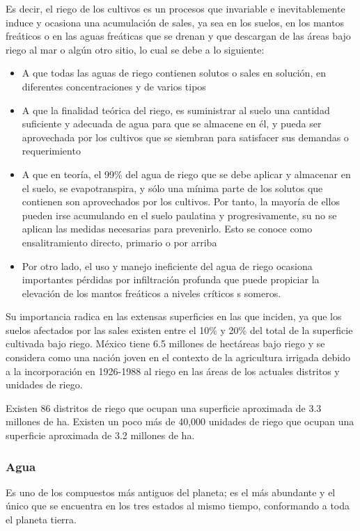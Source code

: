     Es decir, el riego de los cultivos es un procesos que invariable e inevitablemente induce y ocasiona una acumulación de sales, ya sea en los suelos, en los mantos freáticos o en las aguas freáticas que se drenan y que descargan de las áreas bajo riego al mar o algún otro sitio, lo cual se debe a lo siguiente:
    \begin{itemize}
        \item A que todas las aguas de riego contienen solutos o sales en solución, en diferentes concentraciones y de varios tipos
        \item A que la finalidad teórica del riego, es suministrar al suelo una cantidad suficiente y adecuada de agua para que se almacene en él, y pueda ser aprovechada por los cultivos que se siembran para satisfacer sus demandas o requerimiento
        \item A que en teoría, el 99\% del agua de riego que se debe aplicar y almacenar en el suelo, se evapotranspira, y sólo una mínima parte de los solutos que contienen son aprovechados por los cultivos. Por tanto, la mayoría de ellos pueden irse acumulando en el suelo paulatina y progresivamente, su no se aplican las medidas necesarias para prevenirlo. Esto se conoce como ensalitramiento directo, primario o por arriba
        \item Por otro lado, el uso y manejo ineficiente del agua de riego ocasiona importantes pérdidas por infiltración profunda que puede propiciar la elevación de los mantos freáticos a niveles críticos s someros.
    \end{itemize}
    Su importancia radica en las extensas superficies en las que inciden, ya que los suelos afectados por las sales existen entre el 10\% y 20\% del total de la superficie cultivada bajo riego. México tiene 6.5 millones de hectáreas bajo riego y se considera como una nación joven en el contexto de la agricultura irrigada debido a la incorporación en 1926-1988 al riego en las áreas de los actuales distritos y unidades de riego.
    
    Existen 86 distritos de riego que ocupan una superficie aproximada de 3.3 millones de ha. Existen un poco más de 40,000 unidades de riego que ocupan una superficie aproximada de 3.2 millones de ha.
    
    \subsubsection{Agua}
    Es uno de los compuestos más antiguos del planeta; es el más abundante y el único que se encuentra en los tres estados al mismo tiempo, conformando a toda el planeta tierra.
    
